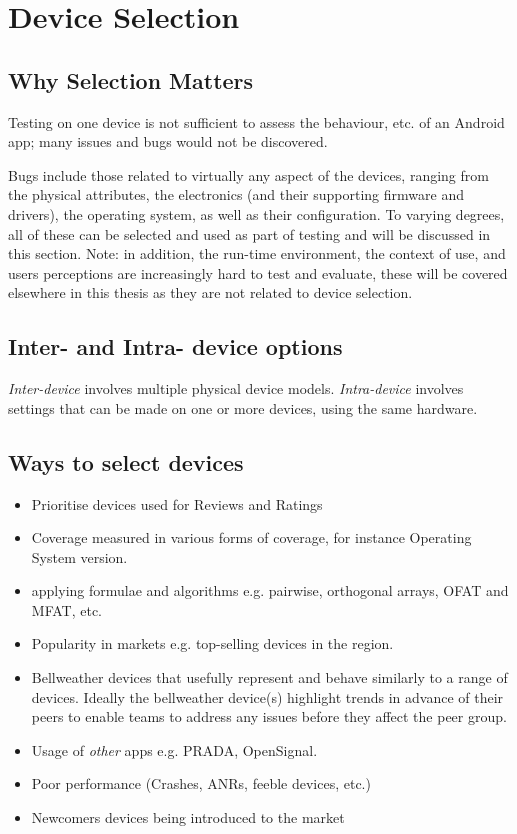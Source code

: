 \section{Device Selection}

\subsection{Why Selection Matters}
Testing on one device is not sufficient to assess the behaviour, etc. of an Android app; many issues and bugs would not be discovered. 

Bugs include those related to virtually any aspect of the devices, ranging from the physical attributes, the electronics (and their supporting firmware and drivers), the operating system, as well as their configuration. To varying degrees, all of these can be selected and used as part of testing and will be discussed in this section. Note: in addition, the run-time environment, the context of use, and users perceptions are increasingly hard to test and evaluate, these will be covered elsewhere in this thesis as they are not related to device selection.
\subsection{Inter- and Intra- device options}
\textit{Inter-device} involves multiple physical device models. \textit{Intra-device} involves settings that can be made on one or more devices, using the same hardware.

\subsection{Ways to select devices}

\begin{itemize}
    \item Prioritise devices used for Reviews and Ratings
    \item Coverage measured in various forms of coverage, for instance Operating System version.
    \item applying formulae and algorithms e.g. pairwise, orthogonal arrays, OFAT and MFAT, etc.
    \item Popularity in markets e.g. top-selling devices in the region.
    \item Bellweather devices that usefully represent and behave similarly to a range of devices. Ideally the bellweather device(s) highlight trends in advance of their peers to enable teams to address any issues before they affect the peer group.
    \item Usage of \textit{other} apps e.g. PRADA, OpenSignal.
    \item Poor performance (Crashes, ANRs, feeble devices, etc.)
    \item Newcomers devices being introduced to the market
\end{itemize}

